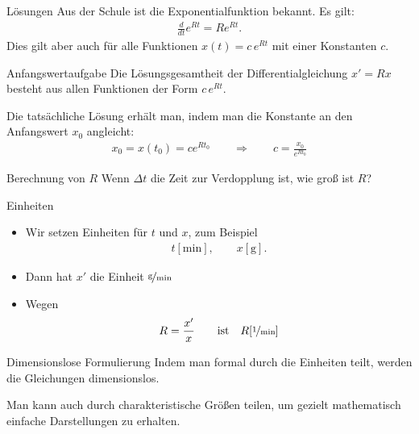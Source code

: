 \documentclass[notheorems,hidelinks,aspectratio=1610]{beamer}
\begin{document}
\begin{frame}{Lösungen}
  Aus der Schule ist die Exponentialfunktion bekannt. Es gilt:
  \begin{gather*}
    \tfrac d{dt} e^{Rt} = R e^{Rt}.
  \end{gather*}
  Dies gilt aber auch für alle Funktionen $x(t) = c \,e^{Rt}$ mit einer Konstanten $c$.

  \begin{block}{Anfangswertaufgabe}
    Die Lösungsgesamtheit der Differentialgleichung $x' = Rx$ besteht
    aus allen Funktionen der Form $c\,e^{Rt}$.

    \vspace{1ex}

    Die tatsächliche Lösung erhält man, indem man die Konstante an den Anfangswert $x_0$ angleicht:
    \begin{gather*}
      x_0 = x(t_0) = c e^{Rt_0} \qquad \Rightarrow \qquad c = \frac{x_0}{e^{R t_0}}
    \end{gather*}
  \end{block}
\end{frame}

\begin{frame}{Berechnung von $R$}
  Wenn $\Delta t$ die Zeit zur Verdopplung ist, wie groß ist $R$?

  \vspace{5cm}
  
\end{frame}

\begin{frame}{Einheiten}
  \begin{minipage}{.5\textwidth}
  \begin{itemize}
  \item Wir setzen Einheiten für $t$ und $x$, zum Beispiel
    \begin{gather*}
      t[\text{min}],\qquad x[\text{g}].
    \end{gather*}
  \item Dann hat $x'$ die Einheit $\nicefrac{\text{g}}{\text{min}}$
  \item Wegen
    \begin{gather*}
      R = \frac{x'}{x} \qquad\text{ist}\quad R[\nicefrac1{\text{min}}]
    \end{gather*}
  \end{itemize}    
  \end{minipage}
  \pause
  \begin{block}{Dimensionslose Formulierung}
    Indem man formal durch die Einheiten teilt, werden die Gleichungen
    dimensionslos.

    \vspace{1ex}

    Man kann auch durch charakteristische Größen teilen, um gezielt
    mathematisch einfache Darstellungen zu erhalten.
  \end{block}
\end{frame}
\end{document}
